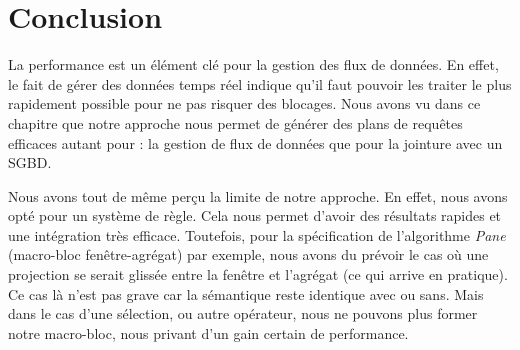 \section{Conclusion}\label{sec:valid:perfs:conclusion}
La performance est un élément clé pour la gestion des flux de données. En effet, le fait de gérer des données temps réel indique qu'il faut pouvoir les traiter le plus rapidement possible pour ne pas risquer des blocages. Nous avons vu dans ce chapitre que notre approche nous permet de générer des plans de requêtes efficaces autant pour : la gestion de flux de données que pour la jointure avec un SGBD.

Nous avons tout de même perçu la limite de notre approche. En effet, nous avons opté pour un système de règle. Cela nous permet d'avoir des résultats rapides et une intégration très efficace. Toutefois, pour la spécification de l'algorithme \textit{Pane} (macro-bloc fenêtre-agrégat) par exemple, nous avons du prévoir le cas où une projection se serait glissée entre la fenêtre et l'agrégat (ce qui arrive en pratique). Ce cas là n'est pas grave car la sémantique reste identique avec ou sans. Mais dans le cas d'une sélection, ou autre opérateur, nous ne pouvons plus former notre macro-bloc, nous privant d'un gain certain de performance.